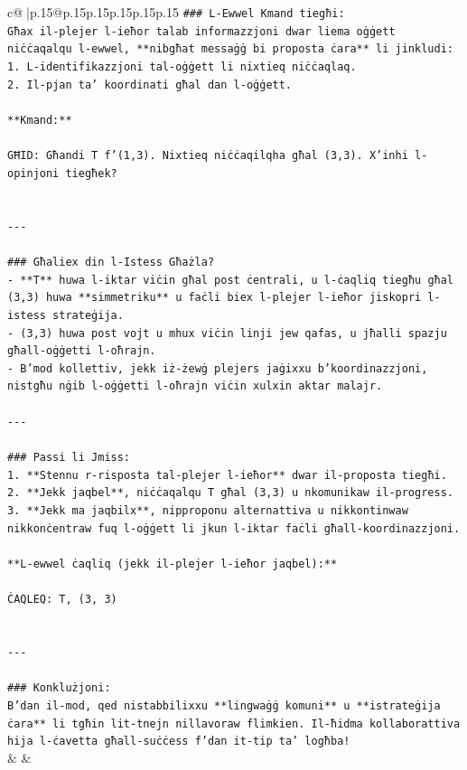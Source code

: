 \documentclass{article}
\begin{document}
{\begin{supertabular}{c@{$\;$}|p{.15\linewidth}@{}p{.15\linewidth}p{.15\linewidth}p{.15\linewidth}p{.15\linewidth}p{.15\linewidth}}
{{{\texttt{\#\#\# L{-}Ewwel Kmand tiegħi:} \\
\texttt{Għax il{-}plejer l{-}ieħor talab informazzjoni dwar liema oġġett niċċaqalqu l{-}ewwel, **nibgħat messaġġ bi proposta ċara** li jinkludi:} \\
\texttt{1. L{-}identifikazzjoni tal{-}oġġett li nixtieq niċċaqlaq.} \\
\texttt{2. Il{-}pjan ta' koordinati għal dan l{-}oġġett.} \\
\\ 
\texttt{**Kmand:**} \\
\\ 
\texttt{GĦID: Għandi T f'(1,3). Nixtieq niċċaqilqha għal (3,3). X'inhi l{-}opinjoni tiegħek?} \\
\\ 
\\ 
\texttt{{-}{-}{-}} \\
\\ 
\texttt{\#\#\# Għaliex din l{-}Istess Għażla?} \\
\texttt{{-} **T** huwa l{-}iktar viċin għal post ċentrali, u l{-}ċaqliq tiegħu għal (3,3) huwa **simmetriku** u faċli biex l{-}plejer l{-}ieħor jiskopri l{-}istess strateġija.} \\
\texttt{{-} (3,3) huwa post vojt u mhux viċin linji jew qafas, u jħalli spazju għall{-}oġġetti l{-}oħrajn.} \\
\texttt{{-} B'mod kollettiv, jekk iż{-}żewġ plejers jaġixxu b'koordinazzjoni, nistgħu nġib l{-}oġġetti l{-}oħrajn viċin xulxin aktar malajr.} \\
\\ 
\texttt{{-}{-}{-}} \\
\\ 
\texttt{\#\#\# Passi li Jmiss:} \\
\texttt{1. **Stennu r{-}risposta tal{-}plejer l{-}ieħor** dwar il{-}proposta tiegħi.} \\
\texttt{2. **Jekk jaqbel**, niċċaqalqu T għal (3,3) u nkomunikaw il{-}progress.} \\
\texttt{3. **Jekk ma jaqbilx**, nipproponu alternattiva u nikkontinwaw nikkonċentraw fuq l{-}oġġett li jkun l{-}iktar faċli għall{-}koordinazzjoni.} \\
\\ 
\texttt{**L{-}ewwel ċaqliq (jekk il{-}plejer l{-}ieħor jaqbel):**} \\
\\ 
\texttt{ĊAQLEQ: T, (3, 3)} \\
\\ 
\\ 
\texttt{{-}{-}{-}} \\
\\ 
\texttt{\#\#\# Konklużjoni:} \\
\texttt{B'dan il{-}mod, qed nistabbilixxu **lingwaġġ komuni** u **istrateġija ċara** li tgħin lit{-}tnejn nillavoraw flimkien. Il{-}ħidma kollaborattiva hija l{-}ċavetta għall{-}suċċess f'dan it{-}tip ta' logħba!} \\
            }
        }
    }
    & & \\ \\


\end{supertabular}}
\end{document}
